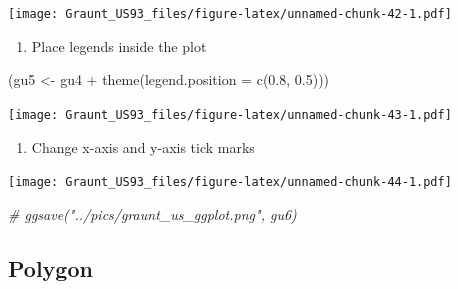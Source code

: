 \documentclass[
]{article}
\newenvironment{Shaded}{\begin{snugshade}}{\end{snugshade}}
\newcommand{\AttributeTok}[1]{\textcolor[rgb]{0.77,0.63,0.00}{#1}}
\newcommand{\CommentTok}[1]{\textcolor[rgb]{0.56,0.35,0.01}{\textit{#1}}}
\newcommand{\FloatTok}[1]{\textcolor[rgb]{0.00,0.00,0.81}{#1}}
\newcommand{\FunctionTok}[1]{\textcolor[rgb]{0.00,0.00,0.00}{#1}}
\newcommand{\NormalTok}[1]{#1}
\newcommand{\OtherTok}[1]{\textcolor[rgb]{0.56,0.35,0.01}{#1}}
\newcommand{\SpecialCharTok}[1]{\textcolor[rgb]{0.00,0.00,0.00}{#1}}
\providecommand{\tightlist}{%
  \setlength{\itemsep}{0pt}\setlength{\parskip}{0pt}}
\begin{document}
\texttt{[image: Graunt\_US93\_files/figure-latex/unnamed-chunk-42-1.pdf]}

\begin{enumerate}
\def\labelenumi{\arabic{enumi}.}
\setcounter{enumi}{4}
\tightlist
\item
  Place legends inside the plot
\end{enumerate}

\begin{Shaded}
\begin{Highlighting}[]
\NormalTok{(gu5 }\OtherTok{\textless{}{-}}\NormalTok{ gu4 }\SpecialCharTok{+} 
   \FunctionTok{theme}\NormalTok{(}\AttributeTok{legend.position =} \FunctionTok{c}\NormalTok{(}\FloatTok{0.8}\NormalTok{, }\FloatTok{0.5}\NormalTok{)))}
\end{Highlighting}
\end{Shaded}

\texttt{[image: Graunt\_US93\_files/figure-latex/unnamed-chunk-43-1.pdf]}

\begin{enumerate}
\def\labelenumi{\arabic{enumi}.}
\setcounter{enumi}{5}
\tightlist
\item
  Change x-axis and y-axis tick marks
\end{enumerate}

\begin{Shaded}
\end{Shaded}

\texttt{[image: Graunt\_US93\_files/figure-latex/unnamed-chunk-44-1.pdf]}

\begin{Shaded}
\begin{Highlighting}[]
\CommentTok{\# ggsave("../pics/graunt\_us\_ggplot.png", gu6)}
\end{Highlighting}
\end{Shaded}

\hypertarget{polygon-1}{%
\subsection{Polygon}\label{polygon-1}}
\end{document}
